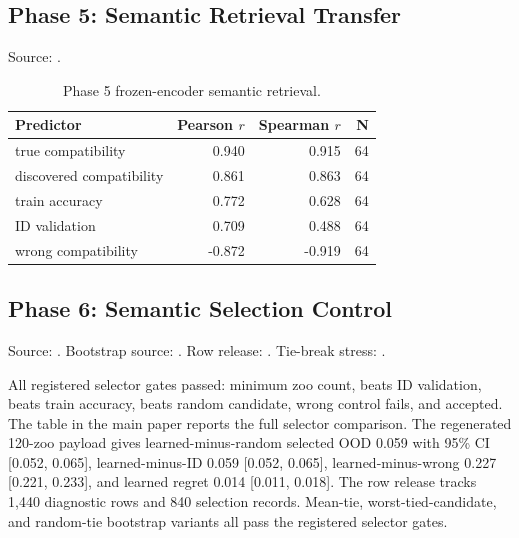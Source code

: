 \subsection{Phase 5: Semantic Retrieval Transfer}

Source:
.

\begin{table}[h]
\centering
\small
\begin{tabular}{lrrr}
\toprule
Predictor & Pearson $r$ & Spearman $r$ & N \\
\midrule
true compatibility & 0.940 & 0.915 & 64 \\
discovered compatibility & 0.861 & 0.863 & 64 \\
train accuracy & 0.772 & 0.628 & 64 \\
ID validation & 0.709 & 0.488 & 64 \\
wrong compatibility & -0.872 & -0.919 & 64 \\
\bottomrule
\end{tabular}
\caption{Phase 5 frozen-encoder semantic retrieval.}
\end{table}

\subsection{Phase 6: Semantic Selection Control}

Source:
.
Bootstrap source:
.
Row release:
.
Tie-break stress:
.

All registered selector gates passed: minimum zoo count, beats ID validation,
beats train accuracy, beats random candidate, wrong control fails, and accepted.
The table in the main paper reports the full selector comparison. The
regenerated 120-zoo payload gives learned-minus-random selected OOD 0.059 with
95\% CI [0.052, 0.065], learned-minus-ID 0.059 [0.052, 0.065],
learned-minus-wrong 0.227 [0.221, 0.233], and learned regret 0.014
[0.011, 0.018]. The row release tracks 1,440 diagnostic rows and 840 selection
records. Mean-tie, worst-tied-candidate, and random-tie bootstrap variants all
pass the registered selector gates.

